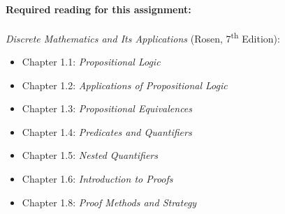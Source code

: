 







\crossline

\paragraph{Required reading for this assignment:}
\emph{Discrete Mathematics and Its Applications} (Rosen, 7\textsuperscript{th} Edition):
\begin{itemize}
\item Chapter 1.1: \emph{Propositional Logic} 
\item Chapter 1.2:  \emph{Applications of Propositional Logic}
\item Chapter 1.3: \emph{Propositional Equivalences}
\item Chapter 1.4: \emph{Predicates and Quantifiers}
\item Chapter 1.5: \emph{Nested Quantifiers}
\item Chapter 1.6:  \emph{Introduction to Proofs}
\item Chapter 1.8:  \emph{Proof Methods and Strategy}
\end{itemize}

\noteondifficultylevel

\crossline

